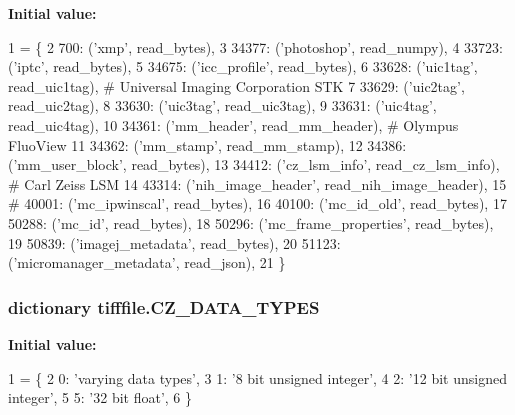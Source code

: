 {\bfseries Initial value\-:}
\begin{DoxyCode}
1 = \{
2     700: (\textcolor{stringliteral}{'xmp'}, read\_bytes),
3     34377: (\textcolor{stringliteral}{'photoshop'}, read\_numpy),
4     33723: (\textcolor{stringliteral}{'iptc'}, read\_bytes),
5     34675: (\textcolor{stringliteral}{'icc\_profile'}, read\_bytes),
6     33628: (\textcolor{stringliteral}{'uic1tag'}, read\_uic1tag),  \textcolor{comment}{# Universal Imaging Corporation STK}
7     33629: (\textcolor{stringliteral}{'uic2tag'}, read\_uic2tag),
8     33630: (\textcolor{stringliteral}{'uic3tag'}, read\_uic3tag),
9     33631: (\textcolor{stringliteral}{'uic4tag'}, read\_uic4tag),
10     34361: (\textcolor{stringliteral}{'mm\_header'}, read\_mm\_header),  \textcolor{comment}{# Olympus FluoView}
11     34362: (\textcolor{stringliteral}{'mm\_stamp'}, read\_mm\_stamp),
12     34386: (\textcolor{stringliteral}{'mm\_user\_block'}, read\_bytes),
13     34412: (\textcolor{stringliteral}{'cz\_lsm\_info'}, read\_cz\_lsm\_info),  \textcolor{comment}{# Carl Zeiss LSM}
14     43314: (\textcolor{stringliteral}{'nih\_image\_header'}, read\_nih\_image\_header),
15     \textcolor{comment}{# 40001: ('mc\_ipwinscal', read\_bytes),}
16     40100: (\textcolor{stringliteral}{'mc\_id\_old'}, read\_bytes),
17     50288: (\textcolor{stringliteral}{'mc\_id'}, read\_bytes),
18     50296: (\textcolor{stringliteral}{'mc\_frame\_properties'}, read\_bytes),
19     50839: (\textcolor{stringliteral}{'imagej\_metadata'}, read\_bytes),
20     51123: (\textcolor{stringliteral}{'micromanager\_metadata'}, read\_json),
21 \}
\end{DoxyCode}
\hypertarget{namespacetifffile_aa2835c5edb61189ec63980bca0e1ed72}{
\subsubsection[{C\-Z\-\_\-\-D\-A\-T\-A\-\_\-\-T\-Y\-P\-E\-S}]{\setlength{\rightskip}{0pt plus 5cm}dictionary tifffile.\-C\-Z\-\_\-\-D\-A\-T\-A\-\_\-\-T\-Y\-P\-E\-S}}\label{namespacetifffile_aa2835c5edb61189ec63980bca0e1ed72}
{\bfseries Initial value\-:}
\begin{DoxyCode}
1 = \{
2     0: \textcolor{stringliteral}{'varying data types'},
3     1: \textcolor{stringliteral}{'8 bit unsigned integer'},
4     2: \textcolor{stringliteral}{'12 bit unsigned integer'},
5     5: \textcolor{stringliteral}{'32 bit float'},
6 \}
\end{DoxyCode}

